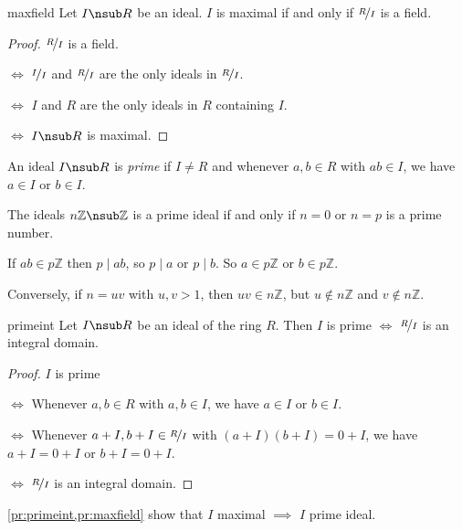 \begin{proposition}{}{maxfield}
    Let \(I \nsub R\) be an ideal. \(I\) is maximal if and only if \(\nicefrac{R}{I}\) is a field.
\end{proposition}
\begin{proof}
    \(\nicefrac{R}{I}\) is a field.

    \(\iff \) \(\nicefrac{I}{I}\) and \(\nicefrac{R}{I}\) are the only ideals in \(\nicefrac{R}{I}\).

    \(\iff \) \(I\) and \(R\) are the only ideals in \(R\) containing \(I\).

    \(\iff \) \(I \nsub R\) is maximal.
\end{proof}
\begin{definition}{}{}
    An ideal \(I \nsub R\) is \textit{prime} if \(I \neq R\) and whenever \(a,b \in R\) with \(ab \in I\), we have \(a \in I\) or \(b \in I\).
\end{definition}
\begin{example}
    The ideals \(n\mathbb{Z}\nsub \mathbb{Z}\) is a prime ideal if and only if \(n = 0\) or \(n = p\) is a prime number.

    If \(ab \in p\mathbb{Z}\) then \(p \mid ab\), so \(p \mid a\) or \(p \mid b\). So \(a \in p\mathbb{Z}\) or \(b \in p\mathbb{Z}\).

    Conversely, if \(n = uv\) with \(u, v > 1\), then \(uv \in n\mathbb{Z}\), but \(u \notin n\mathbb{Z}\) and \(v \notin n\mathbb{Z}\).
\end{example}
\begin{proposition}{}{primeint}
    Let \(I \nsub R\) be an ideal of the ring \(R\). Then \(I\) is prime \(\iff \) \(\nicefrac{R}{I}\) is an integral domain.
\end{proposition}
\begin{proof}
    \(I\) is prime

    \(\iff \) Whenever \(a,b \in R\) with \(a, b \in I\), we have \(a \in I\) or \(b \in I\).

    \(\iff \) Whenever \(a + I, b + I \in \nicefrac{R}{I}\) with \((a + I)(b + I) = 0 + I\), we have \(a + I = 0 + I\) or \(b + I = 0 + I\).

    \(\iff \) \(\nicefrac{R}{I}\) is an integral domain.
\end{proof}
\begin{remark}
    \cref{pr:primeint,pr:maxfield} show that \(I\) maximal \(\implies\) \(I\) prime ideal.
\end{remark}